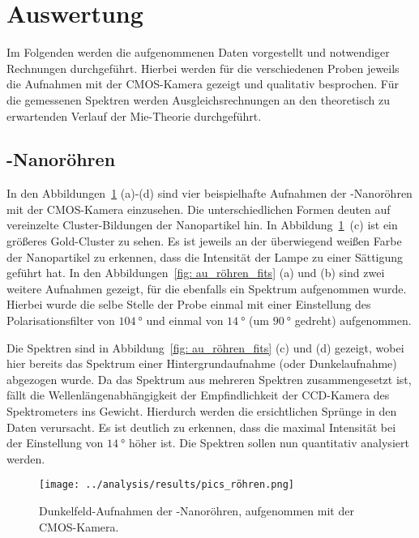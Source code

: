\section{Auswertung}
\label{sec: analysis}
Im Folgenden werden die aufgenommenen Daten vorgestellt und notwendiger Rechnungen durchgeführt.
Hierbei werden für die verschiedenen Proben jeweils die Aufnahmen mit der CMOS-Kamera gezeigt und qualitativ besprochen.
Für die gemessenen Spektren werden Ausgleichsrechnungen an den theoretisch zu erwartenden Verlauf der Mie-Theorie
durchgeführt.

\subsection{-Nanoröhren}
\label{sec: auröhren}
In den Abbildungen~\ref{fig: au_röhren_bilder} (a)-(d) sind vier beispielhafte Aufnahmen der
-Nanoröhren mit der CMOS-Kamera einzusehen. Die unterschiedlichen Formen deuten auf vereinzelte
Cluster-Bildungen der Nanopartikel hin. In Abbildung~\ref{fig: au_röhren_bilder}~(c) ist ein größeres Gold-Cluster
zu sehen. Es ist jeweils an der überwiegend weißen Farbe der Nanopartikel zu erkennen, dass die
Intensität der Lampe zu einer Sättigung geführt hat.
In den Abbildungen~\ref{fig: au_röhren_fits} (a) und (b) sind zwei weitere Aufnahmen gezeigt, für die
ebenfalls ein Spektrum aufgenommen wurde. Hierbei wurde die selbe Stelle der
Probe einmal mit einer Einstellung des Polarisationsfilter von $\SI{104}{\degree}$
und einmal von $\SI{14}{\degree}$ (um $\SI{90}{\degree}$ gedreht) aufgenommen.

Die Spektren sind in Abbildung~\ref{fig: au_röhren_fits} (c) und (d) gezeigt, wobei
hier bereits das Spektrum einer Hintergrundaufnahme (oder Dunkelaufnahme) abgezogen wurde.
Da das Spektrum aus mehreren Spektren zusammengesetzt ist, fällt die Wellenlängenabhängigkeit
der Empfindlichkeit der CCD-Kamera des Spektrometers
ins Gewicht. Hierdurch werden die ersichtlichen Sprünge in den Daten verursacht.
Es ist deutlich zu erkennen, dass
die maximal Intensität bei der Einstellung von $\SI{14}{\degree}$ höher ist.
Die Spektren sollen
nun quantitativ analysiert werden.
\begin{figure}
  \centering
  \texttt{[image: ../analysis/results/pics\_röhren.png]}
  \caption{Dunkelfeld-Aufnahmen der -Nanoröhren, aufgenommen mit der CMOS-Kamera.}
  \label{fig: au_röhren_bilder}
\end{figure}

